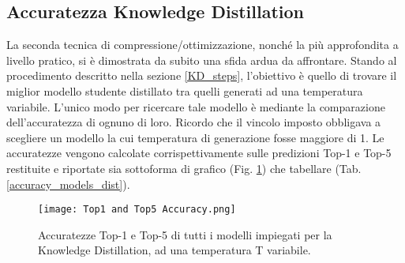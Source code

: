 \subsection{Accuratezza Knowledge Distillation}
La seconda tecnica di compressione/ottimizzazione, nonché la più approfondita 
a livello pratico, si è dimostrata da subito una sfida ardua da affrontare. 
Stando al procedimento descritto nella sezione \ref{KD_steps}, l'obiettivo è quello 
di trovare il miglior modello studente distillato tra quelli generati ad una 
temperatura variabile. L'unico modo per ricercare tale modello è mediante 
la comparazione dell'accuratezza di ognuno di loro. Ricordo che il vincolo 
imposto obbligava a scegliere un modello la cui temperatura di generazione 
fosse maggiore di 1. Le accuratezze vengono calcolate corrispettivamente 
sulle predizioni Top-1 e Top-5 restituite e riportate sia sottoforma di grafico 
(Fig. \ref{accuracy_KD}) che tabellare (Tab. \ref{accuracy_models_dist}).
\begin{figure}
    \centering
    \texttt{[image: Top1 and Top5 Accuracy.png]}
    \centering
    \caption{Accuratezze Top-1 e Top-5 di tutti i modelli impiegati per la Knowledge Distillation, ad una temperatura T variabile.}
    \label{accuracy_KD}
\end{figure}
